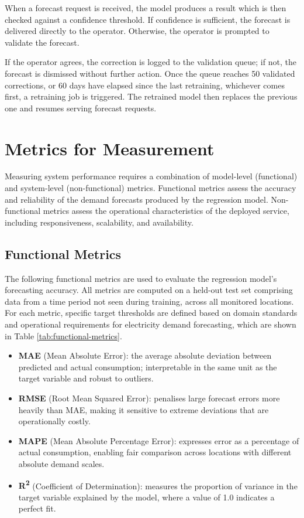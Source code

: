 \documentclass[12pt, a4paper]{report}
\begin{document}
When a forecast request is received, the model produces a result which is then checked against a confidence threshold. If confidence is sufficient, the forecast is delivered directly to the operator. Otherwise, the operator is prompted to validate the forecast.

If the operator agrees, the correction is logged to the validation queue; if not, the forecast is dismissed without further action. Once the queue reaches 50 validated corrections, or 60 days have elapsed since the last retraining, whichever comes first, a retraining job is triggered. The retrained model then replaces the previous one and resumes serving forecast requests.

\section{Metrics for Measurement}

Measuring system performance requires a combination of model-level (functional) and system-level (non-functional) metrics.
Functional metrics assess the accuracy and reliability of the demand forecasts produced by the regression model.
Non-functional metrics assess the operational characteristics of the deployed service, including responsiveness, scalability, and availability.

\subsection{Functional Metrics}

The following functional metrics are used to evaluate the regression model's forecasting accuracy.
All metrics are computed on a held-out test set comprising data from a time period not seen during training, across all monitored locations.
For each metric, specific target thresholds are defined based on domain standards and operational requirements for electricity demand forecasting, which are shown in Table \ref{tab:functional-metrics}.

\begin{itemize}
    \item \textbf{MAE} (Mean Absolute Error): the average absolute deviation between predicted and actual consumption; interpretable in the same unit as the target variable and robust to outliers.
    \item \textbf{RMSE} (Root Mean Squared Error): penalises large forecast errors more heavily than MAE, making it sensitive to extreme deviations that are operationally costly.
    \item \textbf{MAPE} (Mean Absolute Percentage Error): expresses error as a percentage of actual consumption, enabling fair comparison across locations with different absolute demand scales.
    \item \textbf{R\textsuperscript{2}} (Coefficient of Determination): measures the proportion of variance in the target variable explained by the model, where a value of 1.0 indicates a perfect fit.
\end{itemize}
\end{document}
